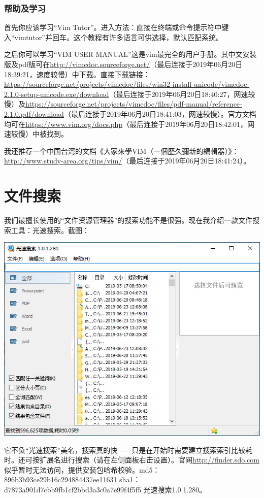 \subsubsection{帮助及学习}
首先你应该学习“Vim Tutor”。进入方法：直接在终端或命令提示符中键入“vimtutor”并回车。这个教程有许多语言可供选择，默认匹配系统。\par
之后你可以学习“VIM USER MANUAL”这是vim最完全的用户手册。其中文安装版及pdf版可在\url{http://vimcdoc.sourceforge.net/}（最后连接于2019年06月20日18:39:21，速度较慢）中下载。直接下载链接：\url{https://sourceforge.net/projects/vimcdoc/files/win32-install-unicode/vimcdoc-2.1.0-setup-unicode.exe/download}（最后连接于2019年06月20日18:40:27，网速较慢）及\url{https://sourceforge.net/projects/vimcdoc/files/pdf-manual/reference-2.1.0.pdf/download}（最后连接于2019年06月20日18:41:03，网速较慢）。官方文档均可在\url{https://www.vim.org/docs.php}（最后连接于2019年06月20日18:42:01，网速较慢）中被找到。\par
我还推荐一个中国台湾的文档《大家來學VIM（一個歷久彌新的編輯器）》：\url{http://www.study-area.org/tips/vim/}（最后连接于2019年06月20日18:41:24）。
\section{文件搜索}
我们最擅长使用的“文件资源管理器”的搜索功能不是很强。现在我介绍一款文件搜索工具：光速搜索。截图：
\begin{center}
	\includegraphics[scale=0.5]{pic/finder}
\end{center} \par
它不负“光速搜索”美名，搜索真的快——只是在开始时需要建立搜索索引比较耗时。还可按扩展名进行搜索（请在左侧面板右击设置）。官网\url{http://finder.sdo.com}似乎暂时无法访问，提供安装包哈希校验。md5：896b3b93ce29b16c294884437ee11631 sha1：d7873a901d7cbb9fb1cf2bbd3a3c0a7e99f4f5f5 光速搜索1.0.1.280。
